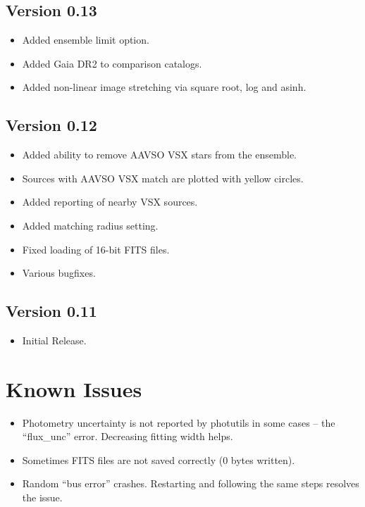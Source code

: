 \documentclass{article}
\begin{document}
\subsection{Version 0.13}
\begin{itemize}
\item Added ensemble limit option.
\item Added Gaia DR2 to comparison catalogs.
\item Added non-linear image stretching via square root, log and asinh. 
\end{itemize}


\subsection{Version 0.12} 
\begin{itemize}
\item Added ability to remove AAVSO VSX stars from the ensemble. 
\item Sources with AAVSO VSX match are plotted with yellow circles. 
\item Added reporting of nearby VSX sources.
\item Added matching radius setting. 
\item Fixed loading of 16-bit FITS files. 
\item Various bugfixes.
\end{itemize}

\subsection{Version 0.11}
\begin{itemize}
\item Initial Release. 
\end{itemize}

\section{Known Issues}
\begin{itemize}
\item Photometry uncertainty is not reported by photutils in some cases -- the ``flux\_unc'' error. Decreasing fitting width helps. 
\item Sometimes FITS files are not saved correctly (0 bytes written).
\item Random ``bus error'' crashes. Restarting and following the same steps resolves the issue.
\end{itemize}
\end{document}
